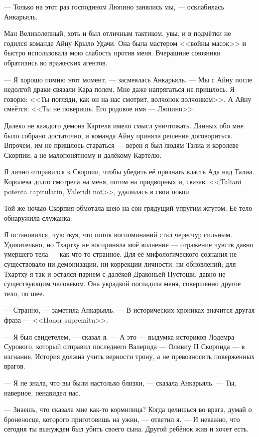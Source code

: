 --- Только на этот раз господином Люпино занялись мы, --- осклабилась Анкарьяль.

Ман Великолепный, хоть и был отличным тактиком, увы, и в подмётки не годился команде Айну Крыло Удачи.
Она была мастером <<войны масок>> и быстро использовала мою слабость против меня.
Вчерашние союзники обратились во вражеских агентов.

--- Я хорошо помню этот момент, --- засмеялась Анкарьяль.
--- Мы с Айну после недолгой драки связали Кара полем.
Мне даже напрягаться не пришлось.
Я говорю: <<Ты погляди, как он на нас смотрит, волчонок волчонком>>.
А Айну смеётся: <<Ты не поверишь.
Его родовое имя --- Люпино>>.

Далеко не каждого демона Картеля имело смысл уничтожать.
Данных обо мне было собрано достаточно, и команда Айну приняла решение договориться.
Впрочем, им не пришлось стараться --- верен я был людям Талиа и королеве Скорпии, а не малопонятному и далёкому Картелю.

Я лично отправился к Скорпии, чтобы убедить её признать власть Ада над Талиа.
Королева долго смотрела на меня, потом на придворных и, сказав: <<Taliani potenta capitulatin, Valeridi not>>\FM, удалилась в свои покои.

Той же ночью Скорпия обмотала шею на сон грядущий упругим жгутом.
Её тело обнаружила служанка.

Я остановился, чувствуя, что поток воспоминаний стал чересчур сильным.
Удивительно, но Тхартху не восприняла моё волнение --- отражение чувств давно умершего тела --- как что-то странное.
Для её мифологического сознания не существовало ни демонизации, ни коррекции личности, ни обновлений;
для Тхартху я так и остался парнем с далёкой Драконьей Пустоши, давно не существующим человеком.
Она украдкой погладила меня, совершенно другое тело, по шее.

--- Странно, --- заметила Анкарьяль.
--- В исторических хрониках значится другая фраза --- <<Honor supremitu>>\FM.

--- Я был свидетелем, --- сказал я.
--- А это --- выдумка историков Лодемра Сурового, который отправил последнего Валерида --- Оливиу II Скорпида --- в изгнание.
История должна учить верности трону, а не превозносить поверженных врагов.

--- Я не знала, что вы были настолько близки, --- сказала Анкарьяль.
--- Ты, наверное, ненавидел нас.

--- Знаешь, что сказала мне как-то кормилица?
Когда целишься во врага, думай о броненосце, которого приготовишь на ужин, --- ответил я.
--- И неважно, что сегодня ты вынужден был убить своего сына.
Другой ребёнок жив и хочет есть.

